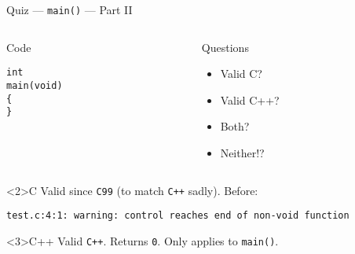 \documentclass[presentation,aspectratio=169]{beamer}
\begin{document}
\begin{frame}[fragile,label={sec:org23c4234}]{Quiz — \texttt{main()} — Part II}
 \begin{columns}
\begin{column}{0.48\columnwidth}
\begin{block}{Code}
\begin{verbatim}
int
main(void)
{
}
\end{verbatim}
\end{block}
\end{column}

\begin{column}{0.48\columnwidth}
\begin{block}{Questions}
\begin{itemize}
\item Valid C?
\item Valid C++?
\item Both?
\item Neither!?
\end{itemize}
\end{block}
\end{column}
\end{columns}

\begin{block}<2>{C}
Valid since \texttt{C99} (to match \texttt{C++} sadly). Before:
\begin{verbatim}
test.c:4:1: warning: control reaches end of non-void function
\end{verbatim}
\end{block}

\vspace{-2cm}
\begin{block}<3>{C++}
Valid \texttt{C++}. Returns \texttt{0}. Only applies to \texttt{main()}.
\end{block}
\end{frame}

\end{document}
